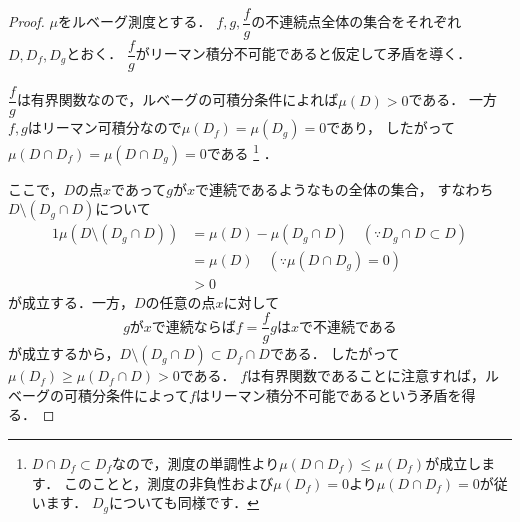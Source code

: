 \documentclass[./index]{subfiles}
\begin{document}
\begin{proof}
    $\mu$をルベーグ測度とする．
    $f, g, \dfrac{f}{g}$の不連続点全体の集合をそれぞれ$D, D_f, D_g$とおく．
    $\dfrac{f}{g}$がリーマン積分不可能であると仮定して矛盾を導く．

    $\dfrac{f}{g}$は有界関数なので，ルベーグの可積分条件によれば$\mu(D) > 0$である．
    一方$f, g$はリーマン可積分なので$\mu(D_f) = \mu(D_g) = 0$であり，
    したがって$\mu(D \cap D_f) = \mu(D \cap D_g) = 0$である
    \footnote{
        $D \cap D_f \subset D_f$なので，測度の単調性より$\mu(D \cap D_f) \le \mu(D_f)$が成立します．
        このことと，測度の非負性および$\mu(D_f) = 0$より$\mu(D \cap D_f) = 0$が従います．
        $D_g$についても同様です．
    }
    ．

    ここで，$D$の点$x$であって$g$が$x$で連続であるようなもの全体の集合，
    すなわち$D \setminus (D_g \cap D)$について
    \begin{alignat}{1}
        \mu(D \setminus (D_g \cap D)) &= \mu(D) - \mu(D_g \cap D) \quad (\because D_g \cap D \subset D) \\
        &= \mu(D) \quad (\because \mu(D \cap D_g) = 0)\\
        &> 0
    \end{alignat}
    が成立する．一方，$D$の任意の点$x$に対して
    \begin{equation}
        \mbox{$g$が$x$で連続ならば$f = \dfrac{f}{g} g$は$x$で不連続である}
    \end{equation}
    が成立するから，$D \setminus (D_g \cap D) \subset D_f \cap D$である．
    したがって$\mu(D_f) \ge \mu(D_f \cap D) > 0$である．
    $f$は有界関数であることに注意すれば，ルベーグの可積分条件によって$f$はリーマン積分不可能であるという矛盾を得る．
\end{proof}
\end{document}
